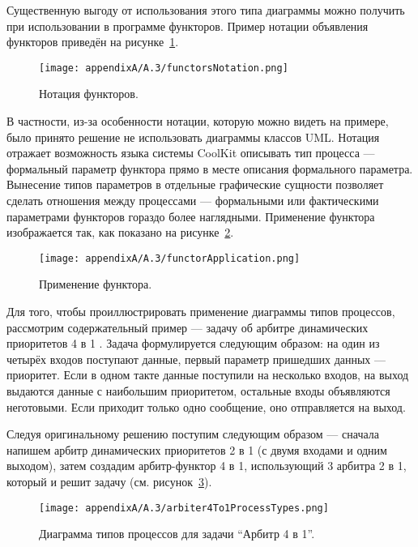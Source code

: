 Существенную выгоду от использования этого типа диаграммы можно получить при использовании 
в программе функторов. Пример нотации объявления функторов приведён на рисунке~\ref{image:functorsNotation}. 

\begin{figure} [ht]
	\begin{center}
		\texttt{[image: appendixA/A.3/functorsNotation.png]}
		\caption{Нотация функторов.}
		\label{image:functorsNotation}
	\end{center}
\end{figure}

В частности, из-за особенности нотации, которую можно видеть на примере, было принято 
решение не использовать диаграммы классов UML. Нотация отражает возможность языка 
системы CoolKit описывать тип процесса --- формальный параметр функтора прямо в месте 
описания формального параметра. Вынесение типов параметров в отдельные графические 
сущности позволяет сделать отношения между процессами --- формальными или фактическими 
параметрами функторов гораздо более наглядными. Применение функтора изображается так, 
как показано на рисунке~\ref{image:functorApplication}.

\begin{figure} [ht]
	\begin{center}
		\texttt{[image: appendixA/A.3/functorApplication.png]}
		\caption{Применение функтора.}
		\label{image:functorApplication}
	\end{center}
\end{figure}

Для того, чтобы проиллюстрировать применение диаграммы типов процессов, рассмотрим 
содержательный пример --- задачу об арбитре динамических приоритетов 4 в 1%
. Задача формулируется следующим образом: на один из четырёх входов поступают данные, 
первый параметр пришедших данных --- приоритет. Если в одном такте данные поступили 
на несколько входов, на выход выдаются данные с наибольшим приоритетом, остальные 
входы объявляются неготовыми. Если приходит только одно сообщение, оно отправляется 
на выход.

Следуя оригинальному решению поступим следующим образом --- сначала напишем арбитр 
динамических приоритетов 2 в 1 (с двумя входами и одним выходом), затем создадим арбитр-функтор 
4 в 1, использующий 3 арбитра 2 в 1, который и решит задачу (см. рисунок~\ref{image:arbiter4To1ProcessTypes}). 

\begin{figure} [ht]
	\begin{center}
		\texttt{[image: appendixA/A.3/arbiter4To1ProcessTypes.png]}
		\caption{Диаграмма типов процессов для задачи "`Арбитр 4 в 1"'.}
		\label{image:arbiter4To1ProcessTypes}
	\end{center}
\end{figure}

